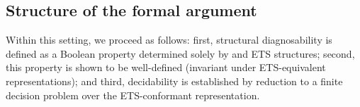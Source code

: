 \subsection{Structure of the formal argument}
Within this setting, we proceed as follows: first, structural diagnosability is
defined as a Boolean property determined solely by \OC{} and ETS structures;
second, this property is shown to be well-defined (invariant under
ETS-equivalent representations); and third, decidability is established by
reduction to a finite decision problem over the ETS-conformant representation.

